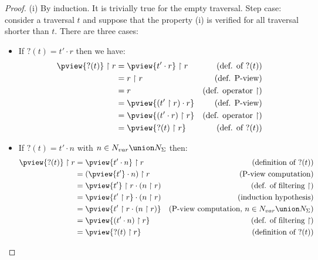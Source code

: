 \begin{proof}
(i) By induction. It is trivially true for the empty
traversal. Step case: consider a traversal $t$ and
suppose that the property (i) is verified for all traversal shorter
than $t$. There are three cases:
\begin{itemize}
\item If $?(t) = t' \cdot r$ then we have:
    \begin{align*}
    \pview{?(t)} \upharpoonright  r
        &=  \pview{t' \cdot r } \upharpoonright  r       & (\mbox{def. of } ?(t))\\
        &=  r \upharpoonright  r                         & (\mbox{def. P-view})\\
        &=  r                                                & (\mbox{def. operator $\upharpoonright$})\\
        &=  \pview{(t' \upharpoonright  r ) \cdot r }    & (\mbox{def. P-view})\\
        &=  \pview{(t' \cdot r)  \upharpoonright  r }    & (\mbox{def. operator $\upharpoonright$})\\
        &= \pview{?(t) \upharpoonright  r }                & (\mbox{def. of } ?(t))
    \end{align*}

\item If $?(t) = t' \cdot n$ with $n \in N_{var} \union N_{\Sigma}$ then:
    \begin{align*}
    \pview{?(t)} \upharpoonright  r
&= \pview{t' \cdot n} \upharpoonright  r & (\mbox{definition of } ?(t))\\
        &= (\pview{t'} \cdot n) \upharpoonright  r  & (\mbox{P-view computation}) \\
        &= \pview{t'} \upharpoonright  r  \cdot (n \upharpoonright  r)            & (\mbox{def. of filtering $\upharpoonright$}) \\
        &= \pview{t' \upharpoonright  r } \cdot (n \upharpoonright  r)           & (\mbox{induction hypothesis}) \\
        &= \pview{t' \upharpoonright  r \cdot (n \upharpoonright  r) } & (\mbox{P-view computation, $n \in N_{var} \union N_{\Sigma}$}) \\
        &= \pview{(t' \cdot n ) \upharpoonright  r  }           & (\mbox{def. of filtering $\upharpoonright$}) \\
        &= \pview{?(t) \upharpoonright  r  }
 & (\mbox{definition of } ?(t))
    \end{align*}



\end{itemize}
\end{proof}
